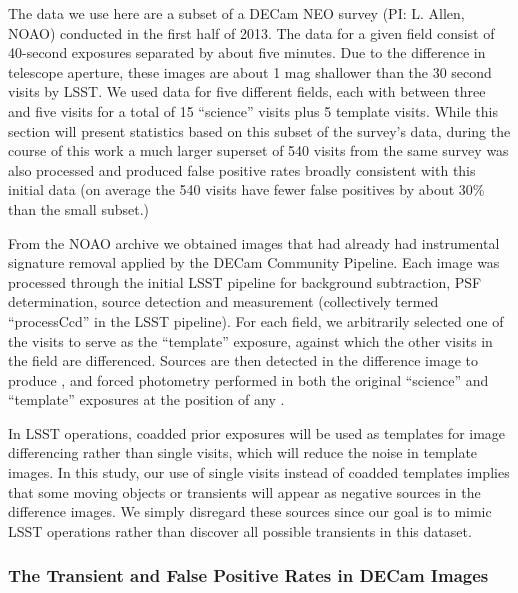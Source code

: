 The data we use here are a subset of a DECam NEO survey (PI: L. Allen, NOAO) conducted
in the first half of 2013. The data for a given field consist of 40-second exposures separated
by about five minutes. Due to the difference in telescope aperture, these images
are about 1 mag shallower than the 30 second visits by LSST. We used data for
five different fields, each with between three and five visits for a total of 15
``science'' visits plus 5 template visits. While this section will present
statistics based on this subset of the survey's data, during the course of this
work a much larger superset of 540 visits from the same survey was also processed and
produced false positive rates broadly consistent with this initial data (on
average the 540 visits have fewer false positives by about 30\% than the small
subset.)

From the NOAO archive we obtained images that had already had instrumental
signature removal applied by the DECam Community Pipeline. Each image was
processed through the initial LSST pipeline for background subtraction, PSF
determination, source detection and measurement (collectively
termed ``processCcd'' in the LSST pipeline). For each field, we arbitrarily
selected one of the visits to serve as the ``template'' exposure, against which
the other visits in the field are differenced. Sources are then detected in the
difference image to produce \DIASources, and forced photometry performed in both
the original ``science'' and ``template'' exposures at the position of any
\DIASource.

In LSST operations, coadded prior exposures will be used
as templates for image differencing rather than single visits, which will reduce
the noise in template images. In this study, our use of single visits instead of
coadded templates implies that some moving objects or transients will appear as
negative sources in the difference images. We simply disregard these sources
since our goal is to mimic LSST operations rather than discover all possible
transients in this dataset.


\subsubsection{The Transient and False Positive Rates in DECam Images}

